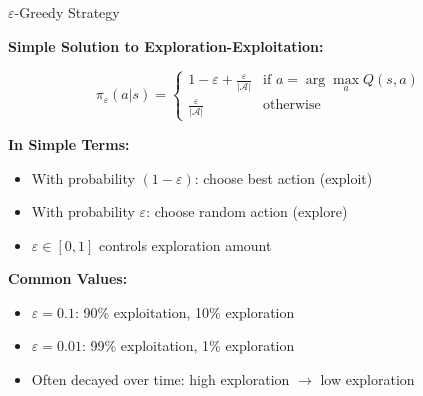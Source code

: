 \documentclass[aspectratio=169,10pt]{beamer}
\begin{document}
\begin{frame}{$\varepsilon$-Greedy Strategy}

\textbf{Simple Solution to Exploration-Exploitation:}

\vfill

$$\pi_{\varepsilon}(a|s) = \begin{cases}
1 - \varepsilon + \frac{\varepsilon}{|\mathcal{A}|} & \text{if } a = \arg\max_a Q(s,a) \\
\frac{\varepsilon}{|\mathcal{A}|} & \text{otherwise}
\end{cases}$$

\vfill

\textbf{In Simple Terms:}
\begin{itemize}
    \item With probability $(1-\varepsilon)$: choose best action (exploit)
    \item With probability $\varepsilon$: choose random action (explore)
    \item $\varepsilon \in [0,1]$ controls exploration amount
\end{itemize}

\vfill

\textbf{Common Values:}
\begin{itemize}
    \item $\varepsilon = 0.1$: 90\% exploitation, 10\% exploration
    \item $\varepsilon = 0.01$: 99\% exploitation, 1\% exploration
    \item Often decayed over time: high exploration $\rightarrow$ low exploration
\end{itemize}

\end{frame}
\end{document}
